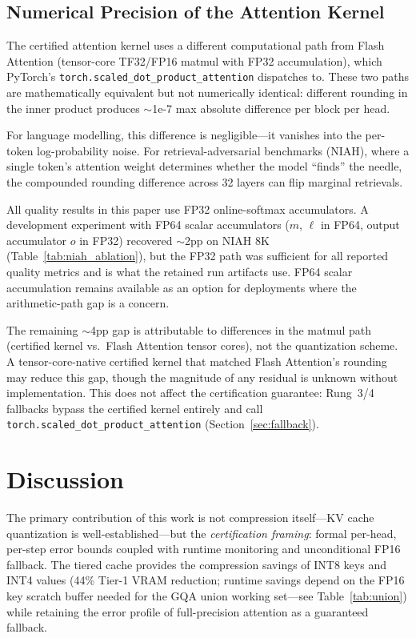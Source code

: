 \documentclass[10pt,twocolumn,a4paper]{article}
\theoremstyle{definition}
\theoremstyle{remark}
\newcommand{\torchsdpa}{\texttt{torch.scaled\_\hspace{0pt}dot\_\hspace{0pt}product\_\hspace{0pt}attention}}
\begin{document}
\subsection{Numerical Precision of the Attention Kernel}
\label{sec:numerical}

The certified attention kernel uses a different computational path from Flash Attention (tensor-core TF32/FP16 matmul with FP32 accumulation), which PyTorch's \torchsdpa{} dispatches to.  These two paths are mathematically equivalent but not numerically identical: different rounding in the inner product produces ${\sim}$1e-7 max absolute difference per block per head.

For language modelling, this difference is negligible---it vanishes into the per-token log-probability noise.  For retrieval-adversarial benchmarks (NIAH), where a single token's attention weight determines whether the model ``finds'' the needle, the compounded rounding difference across 32 layers can flip marginal retrievals.

All quality results in this paper use FP32 online-softmax accumulators.  A development experiment with FP64 scalar accumulators ($m$, $\ell$ in FP64, output accumulator $o$ in FP32) recovered $\sim$2pp on NIAH 8K (Table~\ref{tab:niah_ablation}), but the FP32 path was sufficient for all reported quality metrics and is what the retained run artifacts use.  FP64 scalar accumulation remains available as an option for deployments where the arithmetic-path gap is a concern.

The remaining $\sim$4pp gap is attributable to differences in the matmul path (certified kernel vs.\ Flash Attention tensor cores), not the quantization scheme.  A tensor-core-native certified kernel that matched Flash Attention's rounding may reduce this gap, though the magnitude of any residual is unknown without implementation.  This does not affect the certification guarantee: Rung~3/4 fallbacks bypass the certified kernel entirely and call \torchsdpa{} (Section~\ref{sec:fallback}).


\section{Discussion}
\label{sec:discussion}

The primary contribution of this work is not compression itself---KV cache quantization is well-established---but the \emph{certification framing}: formal per-head, per-step error bounds coupled with runtime monitoring and unconditional FP16 fallback.  The tiered cache provides the compression savings of INT8 keys and INT4 values (44\% Tier-1 VRAM reduction; runtime savings depend on the FP16 key scratch buffer needed for the GQA union working set---see Table~\ref{tab:union}) while retaining the error profile of full-precision attention as a guaranteed fallback.
\end{document}
